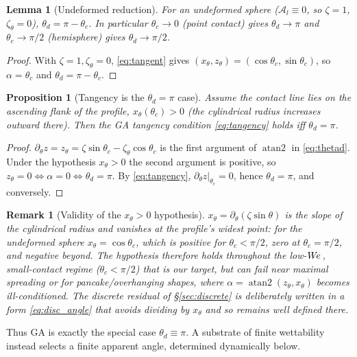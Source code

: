 \documentclass{jfm}
\newcommand{\We}{W\kern-0.15em e\,}
\newtheorem{lemma}{Lemma}
\newtheorem{proposition}{Proposition}
\newtheorem{remark}{Remark}
\begin{document}
\begin{lemma}[Undeformed reduction]\label{lem:sphere}
For an undeformed sphere ($\mathscr A_l\equiv0$, so $\zeta=1$, $\zeta_\theta=0$),
$\theta_d=\pi-\theta_c$. In particular $\theta_c\to0$ (point contact) gives
$\theta_d\to\pi$ and $\theta_c\to\pi/2$ (hemisphere) gives $\theta_d\to\pi/2$.
\end{lemma}
\begin{proof}
With $\zeta=1,\zeta_\theta=0$, \eqref{eq:tangent} gives $(x_\theta,z_\theta)=(\cos\theta_c,\sin\theta_c)$,
so $\alpha=\theta_c$ and $\theta_d=\pi-\theta_c$.
\end{proof}

\begin{proposition}[Tangency is the $\theta_d=\pi$ case]\label{prop:tangency}
Assume the contact line lies on the ascending flank of the profile, $x_\theta(\theta_c)>0$
(the cylindrical radius increases outward there). Then the GA tangency condition
\eqref{eq:tangency} holds iff $\theta_d=\pi$.
\end{proposition}
\begin{proof}
$\partial_\theta z=z_\theta=\zeta\sin\theta_c-\zeta_\theta\cos\theta_c$ is the first
argument of $\operatorname{atan2}$ in \eqref{eq:thetad}. Under the hypothesis
$x_\theta>0$ the second argument is positive, so
$z_\theta=0\iff\alpha=0\iff\theta_d=\pi$. By \eqref{eq:tangency},
$\partial_\theta z|_{\theta_c}=0$, hence $\theta_d=\pi$, and conversely.
\end{proof}

\begin{remark}[Validity of the $x_\theta>0$ hypothesis]\label{rem:xtheta}
$x_\theta=\partial_\theta(\zeta\sin\theta)$ is the slope of the cylindrical radius and
vanishes at the profile's widest point: for the undeformed sphere $x_\theta=\cos\theta_c$,
which is positive for $\theta_c<\pi/2$, zero at $\theta_c=\pi/2$, and negative beyond.
The hypothesis therefore holds throughout the low-$\We$, small-contact regime
($\theta_c<\pi/2$) that is our target, but can fail near maximal spreading or for
pancake/overhanging shapes, where $\alpha=\operatorname{atan2}(z_\theta,x_\theta)$
becomes ill-conditioned. The discrete residual of \S\ref{sec:discrete} is deliberately
written in a form \eqref{eq:disc_angle} that avoids dividing by $x_\theta$ and so
remains well defined there.
\end{remark}

Thus GA is exactly the special case $\theta_d\equiv\pi$. A substrate of finite
wettability instead selects a finite apparent angle, determined dynamically below.
\end{document}
